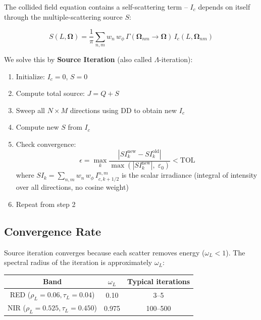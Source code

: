 \documentclass[12pt]{article}
\begin{document}
The collided field equation contains a self-scattering term -- $I_c$ depends
on itself through the multiple-scattering source $S$:

\begin{equation}
  S(L,\boldsymbol{\Omega}) = \frac{1}{\pi}
  \sum_{n,m} w_n\,w_\phi\,\Gamma(\boldsymbol{\Omega}_{nm}\!\to\!\boldsymbol{\Omega})\,
  I_c(L,\boldsymbol{\Omega}_{nm})
\end{equation}

We solve this by \textbf{Source Iteration} (also called $\Lambda$-iteration):

\begin{enumerate}
  \item Initialize: $I_c = 0$, $S = 0$
  \item Compute total source: $J = Q + S$
  \item Sweep all $N \times M$ directions using DD to obtain new $I_c$
  \item Compute new $S$ from $I_c$
  \item Check convergence:
    \begin{equation}
      \epsilon = \max_k
      \frac{|SI_k^\mathrm{new} - SI_k^\mathrm{old}|}
           {\max(|SI_k^\mathrm{new}|,\;\varepsilon_0)}
      < \mathrm{TOL}
    \end{equation}
    where $SI_k = \sum_{n,m} w_n\,w_\phi\,I_{c,k+1/2}^{n,m}$ is the
    scalar irradiance (integral of intensity over all directions, no cosine weight)
  \item Repeat from step 2
\end{enumerate}

\subsection{Convergence Rate}

Source iteration converges because each scatter removes energy ($\omega_L < 1$).
The spectral radius of the iteration is approximately $\omega_L$:

\begin{center}
\begin{tabular}{ccc}
  \toprule
  Band & $\omega_L$ & Typical iterations \\
  \midrule
  RED ($\rho_L=0.06, \tau_L=0.04$) & 0.10 & 3--5 \\
  NIR ($\rho_L=0.525, \tau_L=0.450$) & 0.975 & 100--500 \\
  \bottomrule
\end{tabular}
\end{center}
\end{document}
